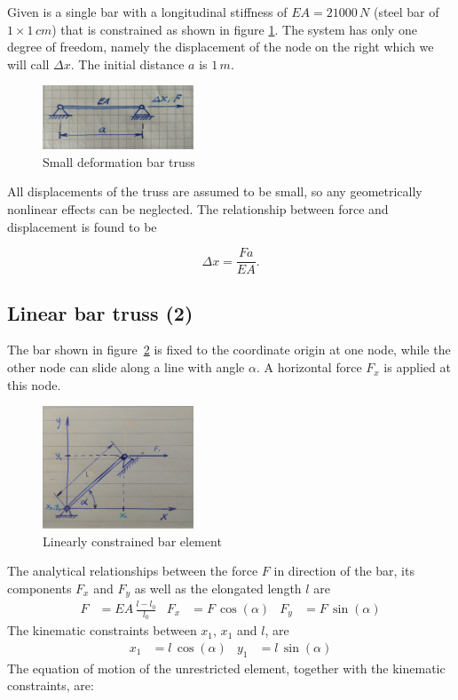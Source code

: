 Given is a single bar with a longitudinal stiffness of $EA = 21000\,\unit{N}$ (steel bar of $1 \times 1\,\unit{cm}$) that is constrained as shown in figure \ref{fig:verification:linear-bar-truss-1}.
The system has only one degree of freedom, namely the displacement of the node on the right which we will call $\Delta x$.
The initial distance $a$ is $1\,\unit{m}$.

\begin{figure}[H]
\centering
\includegraphics[width=0.4\textwidth]{figures/verification/linear-bar-truss-1.png}
\caption{Small deformation bar truss}
\label{fig:verification:linear-bar-truss-1}
\end{figure}

All displacements of the truss are assumed to be small, so any geometrically nonlinear effects can be neglected.
The relationship between force and displacement is found to be

$$
\Delta x = \frac{Fa}{EA}.
$$

\newpage
\subsection*{Linear bar truss (2)}

The bar shown in figure~\ref{fig:verification:linear-constraints} is fixed to the coordinate origin at one node, while the other node can slide along a line with angle $\alpha$.
A horizontal force $F_{x}$ is applied at this node.

\begin{figure}[H]
\centering
\includegraphics[width=0.4\textwidth]{figures/verification/linear-constraints.png}
\caption{Linearly constrained bar element}
\label{fig:verification:linear-constraints}
\end{figure}

The analytical relationships between the force $F$ in direction of the bar, its components $F_{x}$ and $F_{y}$ as well as the elongated length $l$ are
%
\begin{align*}
F &= EA\,\frac{l - l_{0}}{l_{0}} & F_{x} &= F\,\cos(\alpha) & F_{y} &= F\,\sin(\alpha)
\end{align*}
%
The kinematic constraints between $x_{1}$, $x_{1}$ and $l$, are
%
\begin{align*}
x_{1} &= l\,\cos(\alpha) & y_{1} &= l\,\sin(\alpha)
\end{align*}
%
The equation of motion of the unrestricted element, together with the kinematic constraints, are:

